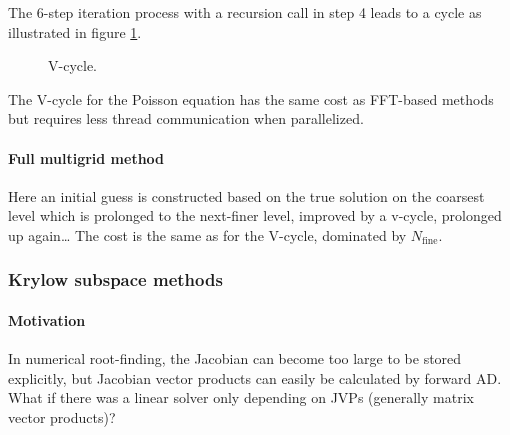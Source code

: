 The 6-step iteration process with a recursion call in step 4 leads to a cycle as
illustrated in figure \ref{fig:vcycle_s}.

\begin{figure}[H]
    \centering
    
    \caption{V-cycle.}
    \label{fig:vcycle_s}
\end{figure}

The V-cycle for the Poisson equation has the same cost as FFT-based methods but
requires less thread communication when parallelized.


\paragraph*{Full multigrid method} Here an initial guess is constructed
based on the true solution on the coarsest level which is prolonged
to the next-finer level, improved by a v-cycle, prolonged up again\dots
The cost is the same as for the V-cycle, dominated by $N_\text{fine}$.

\subsubsection*{Krylow subspace methods}
\paragraph*{Motivation} In numerical root-finding, the Jacobian can become too large
to be stored explicitly, but Jacobian vector products can easily
be calculated by forward AD. What if there was a linear solver
only depending on JVPs (generally matrix vector products)?

